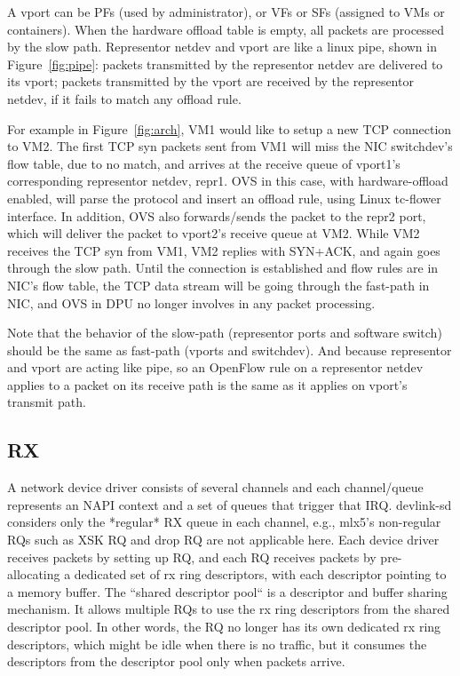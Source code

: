 \documentclass[letterpaper]{article}
\begin{document}
A vport can be PFs (used by administrator), or VFs or SFs (assigned to VMs
or containers). When the hardware offload table is empty, all packets are 
processed by the slow path. Representor netdev and vport are like a linux
pipe, shown in Figure~\ref{fig:pipe}: packets transmitted by the representor
netdev are delivered to its vport; packets transmitted by the vport are
received by the representor netdev, if it fails to match any offload rule.

For example in Figure~\ref{fig:arch}, VM1 would like to setup a new TCP
connection to VM2. The first TCP syn packets sent from VM1 will miss the
NIC switchdev's flow table, due to no match, and arrives at the receive
queue of vport1's corresponding representor netdev, repr1.
OVS in this case, with hardware-offload enabled, will parse the protocol
and insert an offload rule, using Linux tc-flower interface.
In addition, OVS also forwards/sends the packet to the repr2 port, which
will deliver the packet to vport2's receive queue at VM2.
While VM2 receives the TCP syn from VM1, VM2 replies with SYN+ACK, and
again goes through the slow path. Until the connection is established
and flow rules are in NIC's flow table, the TCP data stream will be
going through the fast-path in NIC, and OVS in DPU no longer involves
in any packet processing.

Note that the behavior of the slow-path (representor ports and software
switch) should be the same as fast-path (vports and switchdev).
And because representor and vport are acting like pipe, so an OpenFlow
rule on a representor netdev applies to a packet on its
receive path is the same as it applies on vport's transmit path.

\subsection{RX}
A network device driver consists of several channels and each channel/queue
represents an NAPI context and a set of queues that trigger that IRQ.
devlink-sd considers only the *regular* RX queue in each channel,
e.g., mlx5's non-regular RQs such as XSK RQ and drop RQ are not applicable
here. Each device driver receives packets by setting up RQ, and
each RQ receives packets by pre-allocating a dedicated set of rx
ring descriptors, with each descriptor pointing to a memory buffer.
The ``shared descriptor pool`` is a descriptor and buffer sharing
mechanism. It allows multiple RQs to use the rx ring descriptors
from the shared descriptor pool. In other words, the RQ no longer has
its own dedicated rx ring descriptors, which might be idle when there
is no traffic, but it consumes the descriptors from the descriptor
pool only when packets arrive.
\end{document}
